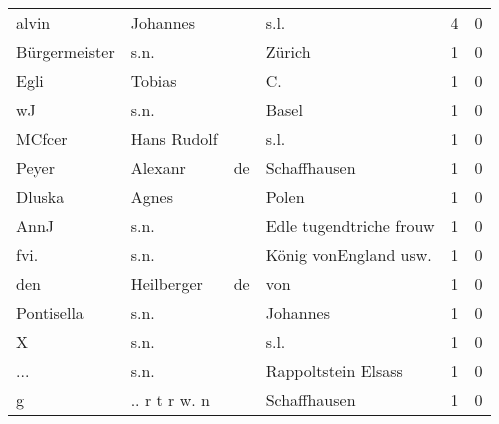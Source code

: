 \documentclass[10pt,a4paper,landscape]{article}
\begin{document}
\begin{longtable}{llllrr}
                    alvin &                           Johannes &             &                                        s.l. &          4 &         0 \\
            Bürgermeister &                               s.n. &             &                                      Zürich &          1 &         0 \\
                     Egli &                             Tobias &             &                                         C.  &          1 &         0 \\
                       wJ &                               s.n. &             &                                       Basel &          1 &         0 \\
                   MCfcer &                        Hans Rudolf &             &                                        s.l. &          1 &         0 \\
                    Peyer &                            Alexanr &          de &                                Schaffhausen &          1 &         0 \\
                   Dluska &                              Agnes &             &                                       Polen &          1 &         0 \\
                     AnnJ &                               s.n. &             &                     Edle tugendtriche frouw &          1 &         0 \\
                     fvi. &                               s.n. &             &                      König vonEngland usw.  &          1 &         0 \\
                      den &                         Heilberger &          de &                                         von &          1 &         0 \\
               Pontisella &                               s.n. &             &                                    Johannes &          1 &         0 \\
                        X &                               s.n. &             &                                        s.l. &          1 &         0 \\
                      ... &                               s.n. &             &                         Rappoltstein Elsass &          1 &         0 \\
                        g &                      .. r t r w. n &             &                                Schaffhausen &          1 &         0 \\

\end{longtable}
\end{document}
